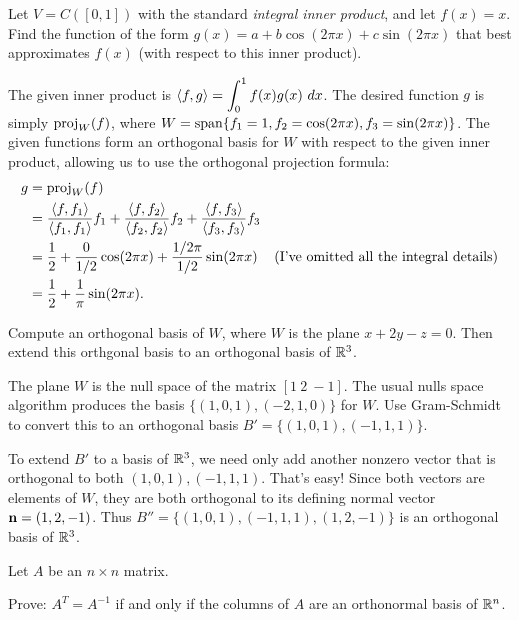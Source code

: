 \ii Let $V=C([0,1])$ with the standard {\em integral inner product}, and let $f(x)=x$. Find the function of the form $g(x)=a+b\cos(2\pi x)+c\sin(2\pi x)$ that best approximates $f(x)$ (with respect to this inner product). 
\\
\begin{solution}
\noindent 
The given inner product is $\ds \angvec{f,g}=\int_0^1f(x)g(x) \ dx$. The desired function $g$ is simply $\proj{f}{W}$, where $W=\Span\{f_1=1, f_2=\cos(2\pi x), f_3=\sin(2\pi x)\}$. The given functions form an orthogonal basis for $W$ with respect to the given inner product, allowing us to use the orthogonal projection formula:
\begin{align*}
g&=\proj{f}{W}\\
&=\frac{\angvec{f,f_1}}{\angvec{f_1,f_1}}f_1+\frac{\angvec{f,f_2}}{\angvec{f_2,f_2}}f_2+\frac{\angvec{f,f_3}}{\angvec{f_3,f_3}}f_3\\
&=\frac{1}{2}+\frac{0}{1/2}\cos(2\pi x)+\frac{1/2\pi}{1/2}\sin(2\pi x) &\text{(I've omitted all the integral details)}\\
&=\frac{1}{2}+\frac{1}{\pi}\sin(2\pi x).
\end{align*}
\end{solution}
\ii Compute an orthogonal basis of $W$, where $W$ is the plane $x+2y-z=0$. Then extend this orthgonal basis to an orthogonal basis of $\R^3$.
\\
\begin{solution}
\noindent
The plane $W$ is the null space of the matrix $[1 \ 2 \ -1]$. The usual nulls space algorithm produces the basis $\{ (1,0,1), (-2,1,0)\}$ for $W$. Use Gram-Schmidt to convert this to an orthogonal basis $B'=\{ (1,0,1), (-1,1,1)\}$. 

\noindent
To extend $B'$ to a basis of $\R^3$, we need only add another nonzero vector that is orthogonal to both $(1,0,1), (-1,1,1)$. That's easy! Since both vectors are elements of $W$, they are both orthogonal to its defining normal vector $\boldn=(1,2,-1)$. Thus $B''=\{(1,0,1),(-1,1,1),(1,2,-1)\}$ is an orthogonal basis of $\R^3$. 
\end{solution}
\ii Let $A$ be an $n\times n$ matrix. 

Prove: $A^T=A^{-1}$ if and only if the columns of $A$ are an orthonormal basis of $\R^n$. 

